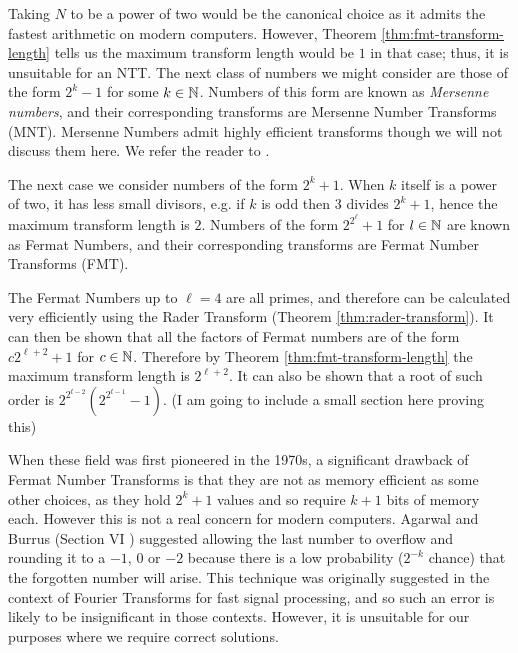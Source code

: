 Taking $N$ to be a power of two would be the canonical choice as it admits the fastest arithmetic on modern computers. However, Theorem \ref{thm:fmt-transform-length} tells us the maximum transform length would be $1$ in that case; thus, it is unsuitable for an NTT. The next class of numbers we might consider are those of the form $2^k - 1$ for some $k \in {\mathbb N}$. Numbers of this form are known as \textit{Mersenne numbers}, and their corresponding transforms are Mersenne Number Transforms (MNT). Mersenne Numbers admit highly efficient transforms though we will not discuss them here. We refer the reader to \cite{mersenne} \cite{mersenne-recent}.

The next case we consider numbers of the form $2^k + 1$. When $k$ itself is a power of two, it has less small divisors, e.g. if $k$ is odd then $3$ divides $2^k + 1$, hence the maximum transform length is $2$. Numbers of the form $2^{2^\ell} + 1$ for $l \in {\mathbb N}$ are known as Fermat Numbers, and their corresponding transforms are Fermat Number Transforms (FMT).

The Fermat Numbers up to $\ell = 4$ are all primes, and therefore can be calculated very efficiently using the Rader Transform (Theorem \ref{thm:rader-transform}). It can then be shown \cite{intro-to-fmt} that all the factors of Fermat numbers are of the form $c2^{\ell + 2} + 1$ for $c \in {\mathbb N}$. Therefore by Theorem \ref{thm:fmt-transform-length} the maximum transform length is $2^{\ell + 2}$. It can also be shown that a root of such order is $2^{2^{t-2}}(2^{2^{t-1}} - 1)$. 
(I am going to include a small section here proving this)

\medskip

When these field was first pioneered in the 1970s, a significant drawback of Fermat Number Transforms is that they are not as memory efficient as some other choices, as they hold $2^k + 1$ values and so require $k + 1$ bits of memory each. However this is not a real concern for modern computers. Agarwal and Burrus (Section VI \cite{intro-to-fmt}) suggested allowing the last number to overflow and rounding it to a $-1$, $0$ or $-2$ because there is a low probability ($2^{-k}$ chance) that the forgotten number will arise. This technique was originally suggested in the context of Fourier Transforms for fast signal processing, and so such an error is likely to be insignificant in those contexts. However, it is unsuitable for our purposes where we require correct solutions.
